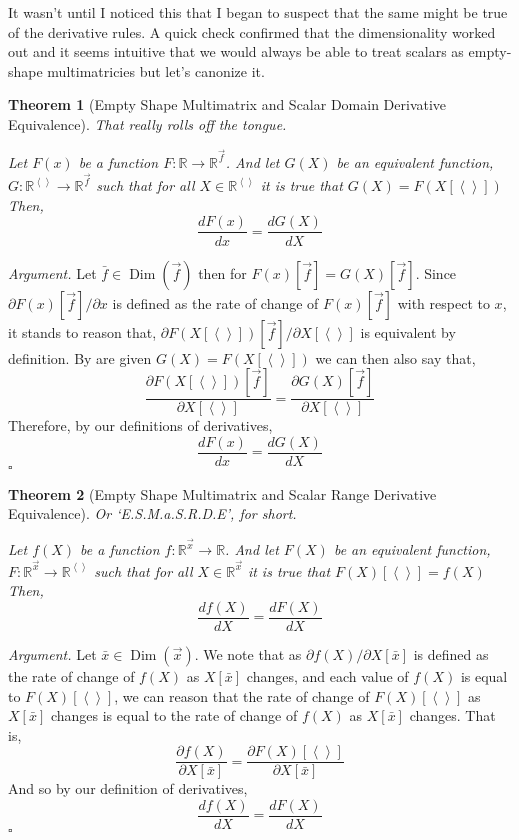 \documentclass[12pt]{book}
\theoremstyle{definition}
\theoremstyle{plain}
\newtheorem{theorem}{Theorem}[chapter]
\theoremstyle{ppart}
\theoremstyle{case}
\theoremstyle{solution}
\newenvironment{argument}{\noindent\textit{Argument.}}{\hfill$\square$}
\DeclareMathOperator{\Dim}{Dim}
\begin{document}
It wasn't until I noticed this that I began to suspect that the same might be true
of the derivative rules.
A quick check confirmed that the dimensionality worked out and it seems intuitive
that we would always be able to treat scalars
as empty-shape multimatricies but let's canonize it.

\begin{theorem}[Empty Shape Multimatrix and Scalar Domain Derivative Equivalence]
\label{s_mm_domain_equiv}
That really rolls off the tongue.

Let $F(x)$ be a function $F : \mathbb{R} \to \mathbb{R}^{\vec{f}}$. And let
$G(X)$ be an equivalent function,
$G : \mathbb{R}^{\left<\right>} \to \mathbb{R}^{\vec{f}}$
such that for all $X \in \mathbb{R}^{\left<\right>}$ it is true that
$G(X) = F(X[\left<\right>])$
Then,
\[ \frac{dF(x)}{dx} = \frac{dG(X)}{dX} \]
\end{theorem}
\begin{argument}
Let $\bar{f} \in \Dim(\vec{f})$ then for $F(x)[\vec{f}] = G(X)[\vec{f}]$.
Since $\partial F(x)[\vec{f}] / \partial x$ is defined as the rate of
change of $F(x)[\vec{f}]$ with respect to $x$, it stands to reason that,
$\partial F(X[\left<\right>])[\vec{f}] / \partial X[\left<\right>]$ is
equivalent by definition. By are given $G(X) = F(X[\left<\right>])$ we
can then also say that,
\[
\frac{ \partial F(X[\left<\right>])[\vec{f}] }{ \partial X[\left<\right>] }
=
\frac{ \partial G(X)[\vec{f}] }{ \partial X[\left<\right>] }
\]
Therefore, by our definitions of derivatives,
\[
\frac{ d F(x) }{ d x }
=
\frac{ d G(X) }{ d X }
\]
\end{argument}

\begin{theorem}[Empty Shape Multimatrix and Scalar Range Derivative Equivalence]
\label{s_mm_range_equiv} Or `E.S.M.a.S.R.D.E', for short.

Let $f(X)$ be a function $f : \mathbb{R}^{\vec{x}} \to \mathbb{R}$. And let
$F(X)$ be an equivalent function,
$F : \mathbb{R}^{\vec{x}} \to \mathbb{R}^{\left<\right>}$
such that for all $X \in \mathbb{R}^{\vec{x}}$ it is true that
$F(X)[\left<\right>] = f(X)$
Then,
\[ \frac{df(X)}{dX} = \frac{dF(X)}{dX} \]
\end{theorem}
\begin{argument}
Let $\bar{x} \in \Dim(\vec{x})$. We note that as $\partial f(X) / \partial X[\bar{x}]$
is defined as the rate of change of $f(X)$ as $X[\bar{x}]$ changes, and each value of
$f(X)$ is equal to $F(X)[\left<\right>]$, we can reason that the rate of change of
$F(X)[\left<\right>]$ as $X[\bar{x}]$ changes is equal to the rate of change of $f(X)$
as $X[\bar{x}]$ changes. That is,
\[
	\frac{\partial f(X)}{\partial X[\bar{x}]}
		=
	\frac{\partial F(X)[\left<\right>]}{\partial X[\bar{x}]}
\]
And so by our definition of derivatives,
\[ \frac{df(X)}{dX} = \frac{dF(X)}{dX} \]
\end{argument}
\end{document}
